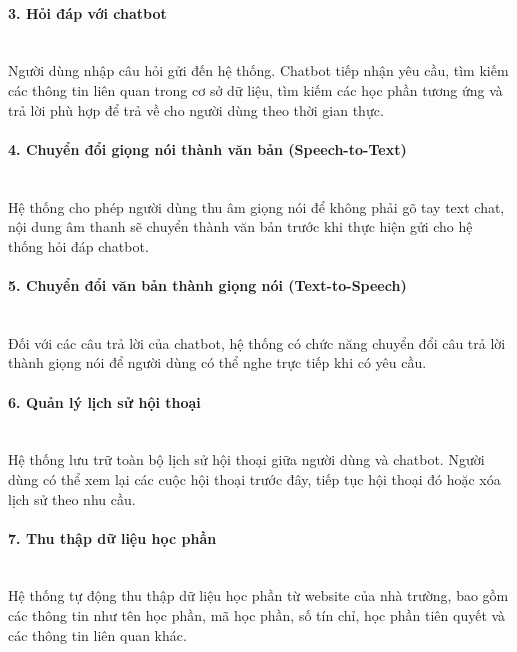 \documentclass[../DoAn.tex]{subfiles}
\begin{document}
\paragraph{3. Hỏi đáp với chatbot}\leavevmode\\
\hspace*{1em}Người dùng nhập câu hỏi gửi đến hệ thống. Chatbot tiếp nhận yêu cầu, tìm kiếm các thông tin liên quan trong cơ sở dữ liệu, tìm kiếm các học phần tương ứng và trả lời phù hợp để trả về cho người dùng theo thời gian thực.

\paragraph{4. Chuyển đổi giọng nói thành văn bản (Speech-to-Text)}\leavevmode\\
\hspace*{1em}Hệ thống cho phép người dùng thu âm giọng nói để không phải gõ tay text chat, nội dung âm thanh sẽ chuyển thành văn bản trước khi thực hiện gửi cho hệ thống hỏi đáp chatbot.

\vspace{1cm}

\paragraph{5. Chuyển đổi văn bản thành giọng nói (Text-to-Speech)}\leavevmode\\
\hspace*{1em}Đối với các câu trả lời của chatbot, hệ thống có chức năng chuyển đổi câu trả lời thành giọng nói để người dùng có thể nghe trực tiếp khi có yêu cầu.

\paragraph{6. Quản lý lịch sử hội thoại}\leavevmode\\
\hspace*{1em}Hệ thống lưu trữ toàn bộ lịch sử hội thoại giữa người dùng và chatbot. Người dùng có thể xem lại các cuộc hội thoại trước đây, tiếp tục hội thoại đó hoặc xóa lịch sử theo nhu cầu.

\paragraph{7. Thu thập dữ liệu học phần}\leavevmode\\
\hspace*{1em}Hệ thống tự động thu thập dữ liệu học phần từ website của nhà trường, bao gồm các thông tin như tên học phần, mã học phần, số tín chỉ, học phần tiên quyết và các thông tin liên quan khác.
\end{document}
